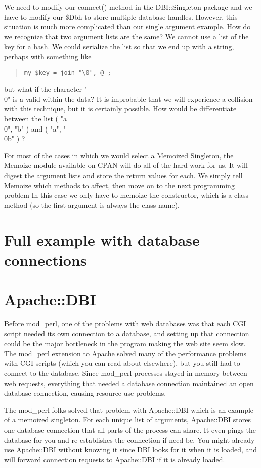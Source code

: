 We need to modify our connect() method in the DBI::Singleton package and we have 
to modify our \$Dbh to store multiple database handles.  However, this
situation is much more complicated than our single argument example.  How
do we recognize that two argument lists are the same?  We cannot use
a list of the key for a hash.  We could serialize the list so that
we end up with a string, perhaps with something like

\begin{quote}
\begin{verbatim}
my $key = join "\0", @_;
\end{verbatim}
\end{quote}
    
but what if the character "\\0" is a valid within the data?  It is improbable
that we will experience a collision with this technique, but it is certainly
possible.  How would be differentiate between the list ( "a\\0", "b" ) and
( "a", "\\0b" ) ?

    
For most of the cases in which we would select a Memoized Singleton, the
Memoize module available on CPAN will do all of the hard work for us.  It will
digest the argument lists and store the return values for each.  We
simply tell Memoize which methods to affect, then move on to the next
programming problem  In this case we only
have to memoize the constructor, which is a class method (so the first
argument is always the class name).     

    \section{Full example with database connections}
    

    \section{Apache::DBI}
    
Before mod\_perl, one of the problems with web databases was that each
CGI script needed its own connection to a database, and setting up
that connection could be the major bottleneck in the program making the
web site seem slow.  The mod\_perl extension to Apache solved many of
the performance problems with CGI scripts (which you can read about elsewhere),
but you still had to connect to the database.  Since mod\_perl processes stayed
in memory between web requests, everything that needed a database connection
maintained an open database connection, causing resource use problems.

The mod\_perl folks solved that problem with Apache::DBI which is an 
example of a memoized singleton.  For each unique list of arguments,
Apache::DBI stores one database connection that all parts of the 
process can share.  It even pings the database for you and re-establishes
the connection if need be.  You might already use Apache::DBI without 
knowing it since DBI looks for it when it is loaded, and will forward
connection requests to Apache::DBI if it is already loaded.
